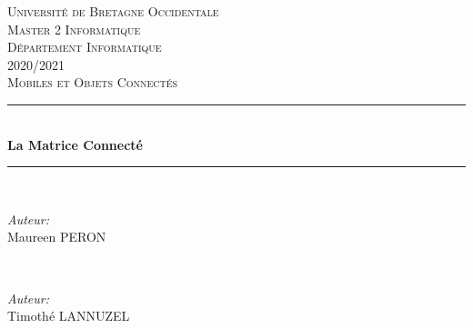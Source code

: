 \documentclass[a4paper,12pt]{report}
\begin{document}
   \begin{titlepage}
    
    \newcommand{\HRule}{\rule{\linewidth}{0.5mm}} %
    
    \center %
     
    
    \textsc{\LARGE Université de Bretagne Occidentale}\\[1.5cm] %
		\textsc{\Large Master 2 Informatique}\\[0.5cm] %
		\textsc{\Large Département Informatique}\\[1.5cm] %
		{\large 2020/2021}\\[1.5cm] %
		
    \textsc{\large Mobiles et Objets Connectés}\\[1cm] %
    
    
   \HRule \\[0.4cm]
    { \huge \bfseries La Matrice Connecté}\\[0.2cm] %
    \HRule \\[1cm]
     
    
    \begin{minipage}{0.48\textwidth}
			\begin{flushleft} \large
				\emph{Auteur:}\\
					Maureen \textsc{PERON} %
			\end{flushleft}
    \end{minipage}
		~
		\begin{minipage}{0.48\textwidth}
			\begin{flushright} \large
				\emph{Auteur:}\\
					Timothé \textsc{LANNUZEL} %
			\end{flushright}
    \end{minipage}\\[0.5cm]
		

\end{titlepage}
\end{document}
